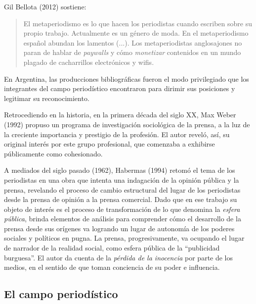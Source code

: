 Gil Bellota (2012) sostiene:

\begin{quote}
El metaperiodismo es lo que hacen los periodistas cuando escriben sobre su propio trabajo. Actualmente es un género de moda. En el metaperiodismo español abundan los lamentos (...). Los metaperiodistas anglosajones no paran de hablar de \emph{paywalls} y cómo \emph{monetizar} contenidos en un mundo plagado de cacharrillos electrónicos y wifis.
\end{quote}

En Argentina, las producciones bibliográficas fueron el modo privilegiado que los integrantes del campo periodístico encontraron para dirimir sus posiciones y legitimar su reconocimiento.

Retrocediendo en la historia, en la primera década del siglo XX, Max Weber (1992) propuso un programa de investigación sociológica de la prensa, a la luz de la creciente importancia y prestigio de la profesión. El autor reveló, así, su original interés por este grupo profesional, que comenzaba a exhibirse públicamente como cohesionado.

A mediados del siglo pasado (1962), Habermas (1994) retomó el tema de los periodistas en una obra que intenta una indagación de la opinión pública y la prensa, revelando el proceso de cambio estructural del lugar de los periodistas desde la prensa de opinión a la prensa comercial. Dado que en ese trabajo su objeto de interés es el proceso de transformación de lo que denomina la \emph{esfera pública}, brinda elementos de análisis para comprender cómo el desarrollo de la prensa desde sus orígenes va logrando un lugar de autonomía de los poderes sociales y políticos en pugna. La prensa, progresivamente, va ocupando el lugar de narrador de la realidad social, como esfera pública de la \enquote{publicidad burguesa}. El autor da cuenta de la \emph{pérdida de la inocencia} por parte de los medios, en el sentido de que toman conciencia de su poder e influencia.

\subsection{El campo periodístico}

